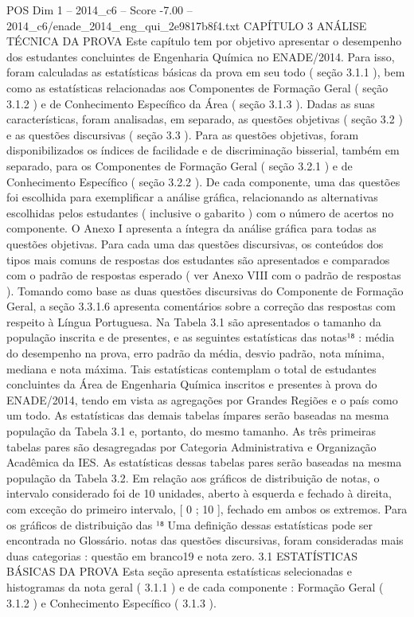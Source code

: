\begin{textsample}{POS Dim 1 – 2014\_c6 – Score -7.00 – 2014\_c6/enade\_2014\_eng\_qui\_2e9817b8f4.txt}  \label{ex:f1_pos_426}
CAPÍTULO 3 ANÁLISE TÉCNICA DA PROVA Este capítulo tem por objetivo apresentar o desempenho dos estudantes concluintes de Engenharia Química no ENADE/2014.
Para isso, foram calculadas as estatísticas básicas da prova em seu todo ( seção 3.1.1 ), bem como as estatísticas relacionadas aos Componentes de Formação Geral ( seção 3.1.2 ) e de Conhecimento Específico da Área ( seção 3.1.3 ).
Dadas as suas características, foram analisadas, em separado, as questões objetivas ( seção 3.2 ) e as questões discursivas ( seção 3.3 ).
Para as questões objetivas, foram disponibilizados os índices de facilidade e de discriminação bisserial, também em separado, para os Componentes de Formação Geral ( seção 3.2.1 ) e de Conhecimento Específico ( seção 3.2.2 ).
De cada componente, uma das questões foi escolhida para exemplificar a análise gráfica, relacionando as alternativas escolhidas pelos estudantes ( inclusive o gabarito ) com o número de acertos no componente.
O Anexo I apresenta a íntegra da análise gráfica para todas as questões objetivas.
Para cada uma das questões discursivas, os conteúdos dos tipos mais comuns de respostas dos estudantes são apresentados e comparados com o padrão de respostas esperado ( ver Anexo VIII com o padrão de respostas ).
Tomando como base as duas questões discursivas do Componente de Formação Geral, a seção 3.3.1.6 apresenta comentários sobre a correção das respostas com respeito à Língua Portuguesa.
Na Tabela 3.1 são apresentados o tamanho da população inscrita e de presentes, e as seguintes estatísticas das notas¹⁸ : média do desempenho na prova, erro padrão da média, desvio padrão, nota mínima, mediana e nota máxima.
Tais estatísticas contemplam o total de estudantes concluintes da Área de Engenharia Química inscritos e presentes à prova do ENADE/2014, tendo em vista as agregações por Grandes Regiões e o país como um todo.
As estatísticas das demais tabelas ímpares serão baseadas na mesma população da Tabela 3.1 e, portanto, do mesmo tamanho.
As três primeiras tabelas pares são desagregadas por Categoria Administrativa e Organização Acadêmica da IES.
As estatísticas dessas tabelas pares serão baseadas na mesma população da Tabela 3.2.
Em relação aos gráficos de distribuição de notas, o intervalo considerado foi de 10 unidades, aberto à esquerda e fechado à direita, com exceção do primeiro intervalo, [ 0 ; 10 ], fechado em ambos os extremos.
Para os gráficos de distribuição das ¹⁸ Uma definição dessas estatísticas pode ser encontrada no Glossário. notas das questões discursivas, foram consideradas mais duas categorias : questão em branco19 e nota zero. 3.1 ESTATÍSTICAS BÁSICAS DA PROVA Esta seção apresenta estatísticas selecionadas e histogramas da nota geral ( 3.1.1 ) e de cada componente : Formação Geral ( 3.1.2 ) e Conhecimento Específico ( 3.1.3 ).

\end{textsample}
